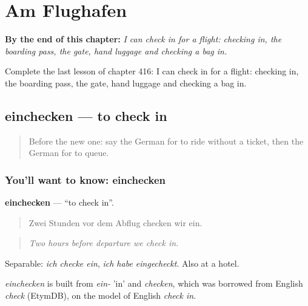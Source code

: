 
\chapter{Am Flughafen}
\label{ch:ge-am-flughafen}

\begin{chapteropening}
\textbf{By the end of this chapter:} \emph{I can check in for a flight: checking in, the boarding pass, the gate, hand luggage and checking a bag in.}

Complete the last lesson of chapter 416: I can check in for a flight: checking in, the boarding pass, the gate, hand luggage and checking a bag in.
\end{chapteropening}

\section[einchecken]{einchecken — to check in}

\label{lesson:GE-C416-einchecken}



\begin{quote}
Before the new one: say the German for to ride without a ticket, then the German for to queue.
\end{quote}

\subsection*{You'll want to know: einchecken}
\textbf{einchecken} — \textquotedblleft{}to check in\textquotedblright{}.

\begin{quote}
Zwei Stunden vor dem Abflug checken wir ein.
\end{quote}

\begin{quote}
\emph{Two hours before departure we check in.}
\end{quote}

Separable: \emph{ich checke ein}, \emph{ich habe eingecheckt}. Also at a hotel.

\begin{cousinweb}
\emph{einchecken} is built from \emph{ein-} 'in' and \emph{checken}, which was borrowed from English \emph{check} (EtymDB), on the model of English \emph{check in}.
\end{cousinweb}

